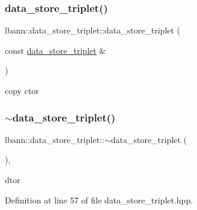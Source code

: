 \subsubsection{\texorpdfstring{data\+\_\+store\+\_\+triplet()}{data\_store\_triplet()}\hspace{0.1cm}{\footnotesize\ttfamily [2/2]}}
{\footnotesize\ttfamily lbann\+::data\+\_\+store\+\_\+triplet\+::data\+\_\+store\+\_\+triplet (\begin{DoxyParamCaption}\item[{const \hyperlink{classlbann_1_1data__store__triplet}{data\+\_\+store\+\_\+triplet} \&}]{ }\end{DoxyParamCaption})\hspace{0.3cm}{\ttfamily [default]}}



copy ctor 

\mbox{\label{classlbann_1_1data__store__triplet_a4051f8b3236f06554c2f35e71d3fdf70}} 
\subsubsection{\texorpdfstring{$\sim$data\+\_\+store\+\_\+triplet()}{~data\_store\_triplet()}}
{\footnotesize\ttfamily lbann\+::data\+\_\+store\+\_\+triplet\+::$\sim$data\+\_\+store\+\_\+triplet (\begin{DoxyParamCaption}{ }\end{DoxyParamCaption})\hspace{0.3cm}{\ttfamily [inline]}, {\ttfamily [override]}}



dtor 



Definition at line 57 of file data\+\_\+store\+\_\+triplet.\+hpp.


